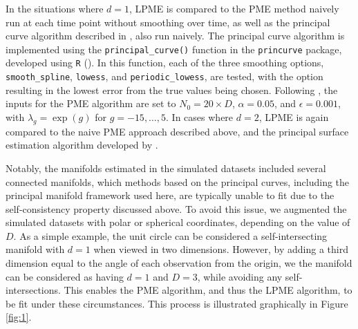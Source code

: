 \documentclass[11pt,reqno]{article}
\theoremstyle{definition}
\begin{document}
In the situations where $d = 1$, LPME is compared to the PME method naively run at each time point without smoothing over time, as well as the principal curve algorithm described in \cite{hastiePrincipalCurves1989}, also run naively. The principal curve algorithm is implemented using the \texttt{principal\_curve()} function in the \texttt{princurve} package, developed using \texttt{R} (\cite{rSoftware2023}). In this function, each of the three smoothing options, \texttt{smooth\_spline}, \texttt{lowess}, and \texttt{periodic\_lowess}, are tested, with the option resulting in the lowest error from the true values being chosen. Following \cite{mengPrincipalManifoldEstimation2021}, the inputs for the PME algorithm are set to $N_0 = 20 \times D$, $\alpha = 0.05$, and $\epsilon = 0.001$, with $\lambda_g = \exp(g)$ for $g = -15, \dots, 5$. In cases where $d = 2$, LPME is again compared to the naive PME approach described above, and the principal surface estimation algorithm developed by \cite{yueParameterizationWhiteMatter2016}.

Notably, the manifolds estimated in the simulated datasets included several connected manifolds, which methods based on the principal curves, including the principal manifold framework used here, are typically unable to fit due to the self-consistency property discussed above. To avoid this issue, we augmented the simulated datasets with polar or spherical coordinates, depending on the value of $D$. As a simple example, the unit circle can be considered a self-intersecting manifold with $d = 1$ when viewed in two dimensions. However, by adding a third dimension equal to the angle of each observation from the origin, we the manifold can be considered as having $d = 1$ and $D = 3$, while avoiding any self-intersections. This enables the PME algorithm, and thus the LPME algorithm, to be fit under these circumstances. This process is illustrated graphically in Figure \ref{fig:1}.
\end{document}
